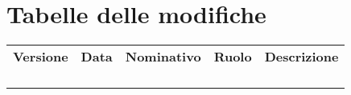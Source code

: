 \section*{Tabelle delle modifiche}
\renewcommand{\arraystretch}{1.5}
\begin{center}
\begin{longtable}{ >{\centering}p{1.5cm} >{\centering}p{1.8cm}
                   >{\centering}p{2.9cm} >{\centering}p{2cm} >{}p{4.4cm} }
				\rowcolorhead
				\centering \textbf{\color{white}Versione} & 
				\centering \textbf{\color{white}Data} &
				\centering \textbf{\color{white}Nominativo} &
				\centering \textbf{\color{white}Ruolo} &
				\centering \textbf{\color{white}Descrizione} 
				
				\tabularnewline 
				 &  &  &  
				& 
				
				\tabularnewline
				 &  &  & 
				& 
				
				\tabularnewline
                 &  &  &
                & 
				
				\tabularnewline
				 &  &  &
				& 
                                       
        \\
        
\end{longtable}
\end{center}
\renewcommand{\arraystretch}{1}


